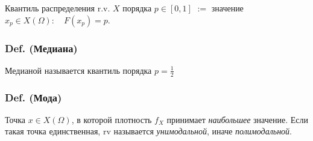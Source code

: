 Квантиль распределения r.v. \(X\) порядка \(p\in [0,1]\) \(:=\) значение
\(x_p\in X(\Omega):\quad F(x_p) = p\).

\subsubsection{Def.
(Медиана)}\label{def.-ux43cux435ux434ux438ux430ux43dux430}

Медианой называется квантиль порядка \(p=\frac{1}{2}\)

\subsubsection{Def. (Мода)}\label{def.-ux43cux43eux434ux430}

Точка \(x\in X(\Omega)\), в которой плотность \(f_X\) принимает
\emph{наибольшее} значение. Если такая точка единственная, rv называется
\emph{унимодальной}, иначе \emph{полимодальной}.
